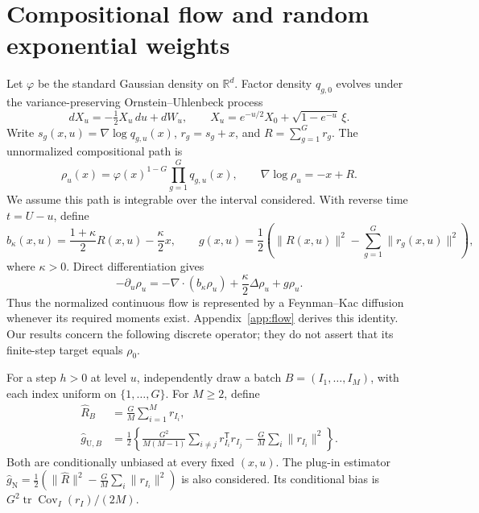 \documentclass{article}
\newcommand{\R}{\mathbb R}
\newcommand{\Cov}{\operatorname{Cov}}
\newcommand{\Uest}{\mathrm U}
\begin{document}
\section{Compositional flow and random exponential weights}
Let $\varphi$ be the standard Gaussian density on $\R^d$. Factor density $q_{g,0}$ evolves under the variance-preserving Ornstein--Uhlenbeck process
\begin{equation}
 dX_u=-\tfrac12X_u\,du+dW_u,\qquad
 X_u=e^{-u/2}X_0+\sqrt{1-e^{-u}}\,\xi.
\end{equation}
Write $s_g(x,u)=\nabla\log q_{g,u}(x)$, $r_g=s_g+x$, and $R=\sum_{g=1}^G r_g$. The unnormalized compositional path is
\begin{equation}\label{eq:path}
 \rho_u(x)=\varphi(x)^{1-G}\prod_{g=1}^Gq_{g,u}(x),\qquad
 \nabla\log\rho_u=-x+R.
\end{equation}
We assume this path is integrable over the interval considered. With reverse time $t=U-u$, define
\begin{equation}\label{eq:drift-potential}
 b_\kappa(x,u)=\frac{1+\kappa}{2}R(x,u)-\frac\kappa2x,
 \qquad
 g(x,u)=\frac12\left(\|R(x,u)\|^2-\sum_{g=1}^G\|r_g(x,u)\|^2\right),
\end{equation}
where $\kappa>0$. Direct differentiation gives
\begin{equation}\label{eq:fk}
 -\partial_u\rho_u=-\nabla\cdot(b_\kappa\rho_u)+\frac\kappa2\Delta\rho_u+g\rho_u.
\end{equation}
Thus the normalized continuous flow is represented by a Feynman--Kac diffusion whenever its required moments exist. Appendix~\ref{app:flow} derives this identity. Our results concern the following discrete operator; they do not assert that its finite-step target equals $\rho_0$.

For a step $h>0$ at level $u$, independently draw a batch $B=(I_1,\ldots,I_M)$, with each index uniform on $\{1,\ldots,G\}$. For $M\ge2$, define
\begin{align}
 \widehat R_B&=\frac GM\sum_{i=1}^M r_{I_i},\label{eq:Rhat}\\
 \widehat g_{\Uest,B}&=\frac12\left\{
 \frac{G^2}{M(M-1)}\sum_{i\ne j}r_{I_i}^{\mathsf T}r_{I_j}
 -\frac GM\sum_i\|r_{I_i}\|^2\right\}.\label{eq:U}
\end{align}
Both are conditionally unbiased at every fixed $(x,u)$. The plug-in estimator $\widehat g_{\mathrm N}=\tfrac12(\|\widehat R\|^2-\tfrac GM\sum_i\|r_{I_i}\|^2)$ is also considered. Its conditional bias is $G^2\operatorname{tr}\Cov_I(r_I)/(2M)$.
\end{document}

